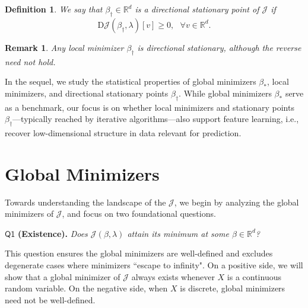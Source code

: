 \documentclass[sn-mathphys-num]{sn-jnl}%
\numberwithin{equation}{section}
\newcommand{\R}{\mathbb{R}}
\theoremstyle{thmstyleone}%
\theoremstyle{thmstyletwo}%
\newtheorem{remark}{Remark}%
\theoremstyle{thmstylethree}%
\newtheorem{definition}{Definition}%
\begin{document}
\vspace{.5em} 
\begin{definition} 
We say that $\beta_{\dagger} \in \R^d$ is a directional stationary point of $\mathcal{J}$ if 
\begin{equation*}
	\mathrm{D}\mathcal{J} (\beta_{\dagger}, \lambda)[v] \ge 0,~~~\forall v\in \R^d.
\end{equation*}
\end{definition} 
\begin{remark}
\emph{Any local minimizer $\beta_{\dagger}$ is directional stationary, although the reverse need not hold. }
\end{remark} 

\vspace{.5em}

In the sequel, we study the statistical properties of global minimizers $\beta_*$, local minimizers, and directional stationary points $\beta_\dagger$. While global minimizers $\beta_*$ serve as a benchmark, our focus is on whether local minimizers and stationary points $\beta_\dagger$---typically reached by iterative algorithms---also support feature learning, i.e., recover low-dimensional structure in data relevant for prediction.


\section{Global Minimizers}
\label{sec:global-minimizers}
Towards understanding the landscape of the $\mathcal{J}$, we begin by analyzing the global minimizers of $\mathcal{J}$, and focus on two foundational questions. 

\vspace{0.5em}
\noindent
$\mathsf{Q1}$ \textbf{(Existence).}
\textit{Does $\mathcal{J}(\beta, \lambda)$ attain its minimum at some $\beta \in \R^d$?}

\vspace{0.5em}
\noindent
This question ensures the global minimizers are well-defined and excludes degenerate cases where minimizers ``escape to infinity". On a positive side, we will show that a global minimizer of $\mathcal{J}$ always exists whenever $X$ is a continuous random variable. On the negative side, when $X$ is discrete, global minimizers need not be well-defined.
\end{document}
